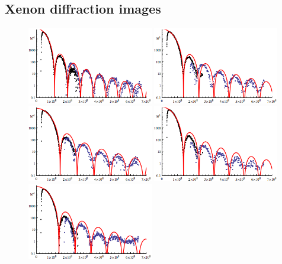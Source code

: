 \subsection{Xenon diffraction images}
\begin{figure}
	\centering
		\includegraphics[width=0.49\textwidth]{images/results/Xe-only-0fs.png}
		\includegraphics[width=0.49\textwidth]{images/results/Xe-only-60fs.png}\\
		\includegraphics[width=0.49\textwidth]{images/results/Xe-only-120fs.png}
		\includegraphics[width=0.49\textwidth]{images/results/Xe-only-250fs.png}\\
		\includegraphics[width=0.49\textwidth]{images/results/Xe-only-400fs.png}

\end{figure}
